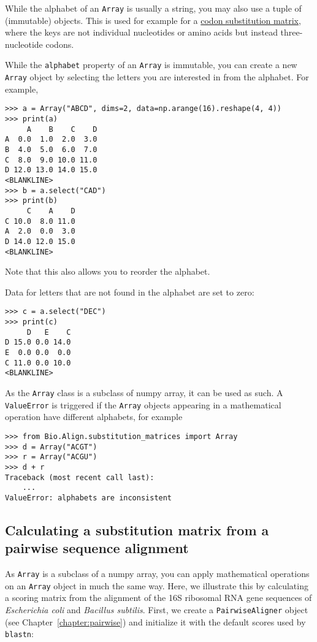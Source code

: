 While the alphabet of an \verb+Array+ is usually a string, you may also use a tuple of (immutable) objects. This is used for example for a \hyperlink{codonmatrix}{codon substitution matrix}, where the keys are not individual nucleotides or amino acids but instead three-nucleotide codons.

While the \verb+alphabet+ property of an \verb+Array+ is immutable, you can create a new \verb+Array+ object by selecting the letters you are interested in from the alphabet. For example,
\begin{verbatim}
>>> a = Array("ABCD", dims=2, data=np.arange(16).reshape(4, 4))
>>> print(a)
     A    B    C    D
A  0.0  1.0  2.0  3.0
B  4.0  5.0  6.0  7.0
C  8.0  9.0 10.0 11.0
D 12.0 13.0 14.0 15.0
<BLANKLINE>
>>> b = a.select("CAD")
>>> print(b)
     C    A    D
C 10.0  8.0 11.0
A  2.0  0.0  3.0
D 14.0 12.0 15.0
<BLANKLINE>
\end{verbatim}
Note that this also allows you to reorder the alphabet.

Data for letters that are not found in the alphabet are set to zero:
\begin{verbatim}
>>> c = a.select("DEC")
>>> print(c)
     D   E    C
D 15.0 0.0 14.0
E  0.0 0.0  0.0
C 11.0 0.0 10.0
<BLANKLINE>
\end{verbatim}

As the \verb+Array+ class is a subclass of numpy array, it can be used as such. A \verb+ValueError+ is triggered if the \verb+Array+ objects appearing in a mathematical operation have different alphabets, for example

\begin{verbatim}
>>> from Bio.Align.substitution_matrices import Array
>>> d = Array("ACGT")
>>> r = Array("ACGU")
>>> d + r
Traceback (most recent call last):
    ...
ValueError: alphabets are inconsistent
\end{verbatim}

\subsection{Calculating a substitution matrix from a pairwise sequence alignment}

As \verb+Array+ is a subclass of a numpy array, you can apply mathematical operations on an \verb+Array+ object in much the same way. Here, we illustrate this by calculating a scoring matrix from the alignment of the 16S ribosomal RNA gene sequences of \textit{Escherichia coli} and \textit{Bacillus subtilis}. First, we create a \verb+PairwiseAligner+ object (see Chapter~\ref{chapter:pairwise}) and initialize it with the default scores used by \verb+blastn+:

